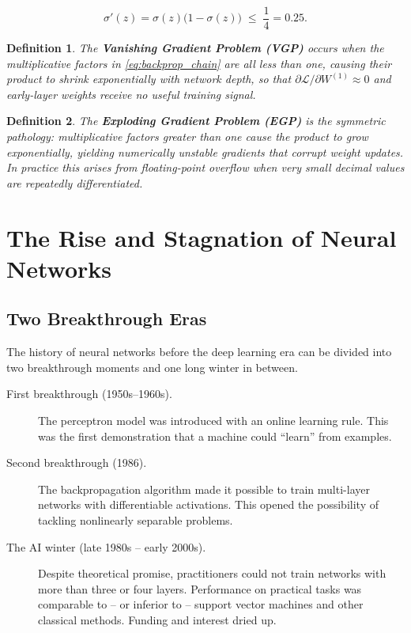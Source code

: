 \documentclass[12pt,a4paper]{article}
\newtheorem{definition}{Definition}[section]
\newcommand{\sigmoid}{\sigma}
\newcommand{\Loss}{\mathcal{L}}
\begin{document}
\begin{equation}
  \sigmoid'(z) = \sigmoid(z)\bigl(1 - \sigmoid(z)\bigr)
               \;\leq\; \frac{1}{4} = 0.25.
  \label{eq:sigmoid_deriv_bound}
\end{equation}

\begin{definition}
\label{def:vgp}
The \textbf{Vanishing Gradient Problem (VGP)} occurs when the
multiplicative factors in \cref{eq:backprop_chain} are all less than
one, causing their product to shrink exponentially with network depth,
so that $\partial \Loss / \partial W^{(1)} \approx 0$ and early-layer
weights receive no useful training signal.
\end{definition}

\begin{definition}
\label{def:egp}
The \textbf{Exploding Gradient Problem (EGP)} is the symmetric
pathology: multiplicative factors greater than one cause the product to
grow exponentially, yielding numerically unstable gradients that
corrupt weight updates.  In practice this arises from floating-point
overflow when very small decimal values are repeatedly differentiated.
\end{definition}

\section{The Rise and Stagnation of Neural Networks}
\label{sec:history}

\subsection{Two Breakthrough Eras}
\label{subsec:breakthroughs}

The history of neural networks before the deep learning era can be
divided into two breakthrough moments and one long winter in between.

\begin{description}
  \item[First breakthrough (1950s--1960s).] The perceptron model was
        introduced with an online learning rule.  This was the first
        demonstration that a machine could ``learn'' from examples.
  \item[Second breakthrough (1986).] The backpropagation algorithm
        made it possible to train multi-layer networks with differentiable
        activations.  This opened the possibility of tackling nonlinearly
        separable problems.
  \item[The AI winter (late 1980s -- early 2000s).] Despite theoretical
        promise, practitioners could not train networks with more than
        three or four layers.  Performance on practical tasks was
        comparable to -- or inferior to -- support vector machines and
        other classical methods.  Funding and interest dried up.
\end{description}
\end{document}
